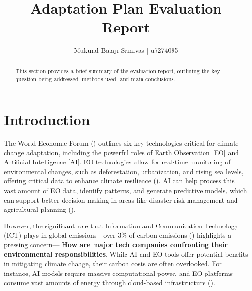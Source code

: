 \documentclass[12pt]{article}
\title{Adaptation Plan Evaluation Report}
\author{Mukund Balaji Srinivas | u7274095}
\date{} %
\begin{document}
\maketitle

\begin{abstract}
This section provides a brief summary of the evaluation report, outlining the key question being addressed, methods used, and main conclusions.
\end{abstract}

\newpage

\section*{Introduction}

The World Economic Forum (\cite{masterson_2024})  outlines six key technologies critical for climate change adaptation, including the powerful roles of Earth Observation [EO] and Artificial Intelligence [AI]. EO technologies allow for real-time monitoring of environmental changes, such as deforestation, urbanization, and rising sea levels, offering critical data to enhance climate resilience (\cite{anderson_2017}). AI can help process this vast amount of EO data, identify patterns, and generate predictive models, which can support better decision-making in areas like disaster risk management and agricultural planning (\cite{Huntingford_2019}).

However, the significant role that Information and Communication Technology (ICT) plays in global emissions—over 3\% of carbon emissions (\cite{jones_2018}) highlights a pressing concern— \textbf{How are major tech companies confronting their environmental responsibilities}. While AI and EO tools offer potential benefits in mitigating climate change, their carbon costs are often overlooked. For instance, AI models require massive computational power, and EO platforms consume vast amounts of energy through cloud-based infrastructure (\cite{taddeo_2021}).
\end{document}
